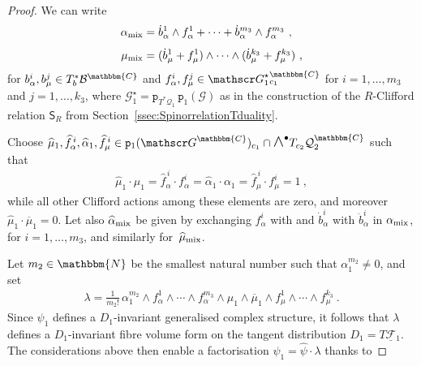\documentclass[a4paper, reqno, 11pt]{amsart}
\numberwithin{equation}{section}
\theoremstyle{definition}
\newcommand{\red}[1]{\underline{#1}}
\newcommand{\rmp}{\mathtt{p}}
\newcommand{\IC}{\mathbbm{C}}
\newcommand{\IN}{\mathbbm{N}}
\newcommand{\cB}{{\mathcal B}}
\newcommand{\cQ}{{\mathcal Q}}
\newcommand{\cF}{{\mathcal F}}
\newcommand{\ccG}{{\mathscr G}}
\newcommand{\sfS}{{\mathsf{S}}}
\newcommand{\midwedge}{\text {\Large$\wedge$}}
\theoremstyle{remark}
\begin{document}
\begin{proof}
We can write
\begin{align}
    \alpha_{\rm mix} &= \dot b_\alpha^1 \wedge f_\alpha^1 + \cdots + \dot b_\alpha^{m_3} \wedge f_\alpha^{m_3}\ ,\\[4pt]
    \mu_{\rm mix} &= (\dot{{b}}_\mu^1  + {f}_\mu^1) \wedge \cdots \wedge (\dot{{b}}_\mu^{k_{3}} + {f}_\mu^{k_{3}})\ ,
\end{align}
for $b_\alpha^i, b_\mu^j \in T_b^*\cB^\IC$ and $f_\alpha^i, f_\mu^j \in \ccG^\star_1{}_{c_1}^\IC$ for $i=1,\ldots,m_3$ and $j=1,\ldots,k_3$, where $\ccG_1^\star = \rmp_{T^*\cQ_1}\,\rmp_1(\ccG)$ as in the construction of the $R$-Clifford relation $\sfS_R$ from Section~\ref{ssec:SpinorrelationTduality}. 

Choose $\widehat\mu_1, \widehat f_\alpha^{\,i}, \widehat\alpha_1, \widehat{{f}}_\mu^{\,i} \in \rmp_1(\ccG^\IC)_{c_1}\cap \midwedge^\bullet T_{c_2}\cQ_2^\IC$ such that 
\begin{align}
    \widehat \mu_1 \cdot \mu_1 = \widehat f_\alpha^{\,i} \cdot f_\alpha^i= \widehat \alpha_1 \cdot \alpha_1 = \widehat{f}_\mu^{\,i} \cdot f_\mu^i = 1 \ ,
\end{align}
while all other Clifford actions among these elements are zero, and moreover $\widehat\mu_1 \cdot \overline{\mu}_1 = 0$. Let also $\widehat \alpha_{\rm mix}$  be given by exchanging $f_\alpha^i$ with  and $\dot b^i_\alpha$ with $\ddot b^i_\alpha$ in $\alpha_{\rm mix}$, for $i=1,\ldots, m_3$, and similarly for~$\widehat\mu_{\rm mix}$.

Let $m_2 \in \IN$ be the smallest natural number such that $\alpha_1^{m_2} \neq 0$, and set
\begin{align}
    \lambda = \frac{1}{m_2!}\,\alpha_1^{m_2} \wedge f_\alpha^1 \wedge \cdots \wedge f_\alpha^{m_3} \wedge \mu_1 \wedge \overline{\mu}_1 \wedge f_\mu^1 \wedge \cdots \wedge f_\mu^{k_3} \ .
\end{align}
Since $\psi_{1}$ defines a $D_1$-invariant generalised complex structure, it follows that $\lambda$ defines a $D_1$-invariant fibre volume form on the tangent distribution $D_1 = T\red\cF{}_1$.
The considerations above then enable a factorisation $\psi_{1} = \widehat \psi \cdot \lambda$ thanks to


\end{proof}
\end{document}

